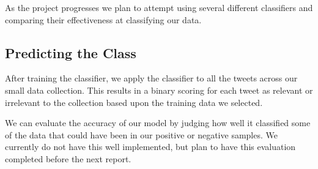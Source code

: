 As the project progresses we plan to attempt using several different classifiers and comparing their effectiveness at classifying our data.

\subsection{Predicting the Class}

After training the classifier, we apply the classifier to all the tweets across our small data collection. This results in a binary scoring for each tweet as relevant or irrelevant to the collection based upon the training data we selected.

We can evaluate the accuracy of our model by judging how well it classified some of the data that could have been in our positive or negative samples. We currently do not have this well implemented, but plan to have this evaluation completed before the next report.











